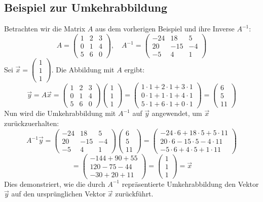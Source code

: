 \subsection{Beispiel zur Umkehrabbildung}
Betrachten wir die Matrix \(A\) aus dem vorherigen Beispiel und ihre Inverse \(A^{-1}\):
\[ A = \begin{pmatrix}
1 & 2 & 3 \\
0 & 1 & 4 \\
5 & 6 & 0
\end{pmatrix}, \quad
A^{-1} = \begin{pmatrix}
-24 & 18 & 5 \\
20 & -15 & -4 \\
-5 & 4 & 1
\end{pmatrix} \]
Sei \(\vec{x} = \begin{pmatrix} 1 \\ 1 \\ 1 \end{pmatrix}\). Die Abbildung mit \(A\) ergibt:
\[ \vec{y} = A\vec{x} = \begin{pmatrix}
1 & 2 & 3 \\
0 & 1 & 4 \\
5 & 6 & 0
\end{pmatrix}
\begin{pmatrix} 1 \\ 1 \\ 1 \end{pmatrix} =
\begin{pmatrix}
1 \cdot 1 + 2 \cdot 1 + 3 \cdot 1 \\
0 \cdot 1 + 1 \cdot 1 + 4 \cdot 1 \\
5 \cdot 1 + 6 \cdot 1 + 0 \cdot 1
\end{pmatrix} =
\begin{pmatrix} 6 \\ 5 \\ 11 \end{pmatrix} \]
Nun wird die Umkehrabbildung mit \(A^{-1}\) auf \(\vec{y}\) angewendet, um \(\vec{x}\) zurückzuerhalten:
\[ A^{-1}\vec{y} = \begin{pmatrix}
-24 & 18 & 5 \\
20 & -15 & -4 \\
-5 & 4 & 1
\end{pmatrix}
\begin{pmatrix} 6 \\ 5 \\ 11 \end{pmatrix} =
\begin{pmatrix}
-24 \cdot 6 + 18 \cdot 5 + 5 \cdot 11 \\
20 \cdot 6 - 15 \cdot 5 - 4 \cdot 11 \\
-5 \cdot 6 + 4 \cdot 5 + 1 \cdot 11
\end{pmatrix} \]
\[ = \begin{pmatrix}
-144 + 90 + 55 \\
120 - 75 - 44 \\
-30 + 20 + 11
\end{pmatrix} =
\begin{pmatrix} 1 \\ 1 \\ 1 \end{pmatrix} = \vec{x} \]
Dies demonstriert, wie die durch \(A^{-1}\) repräsentierte Umkehrabbildung den Vektor \(\vec{y}\) auf den ursprünglichen Vektor \(\vec{x}\) zurückführt.